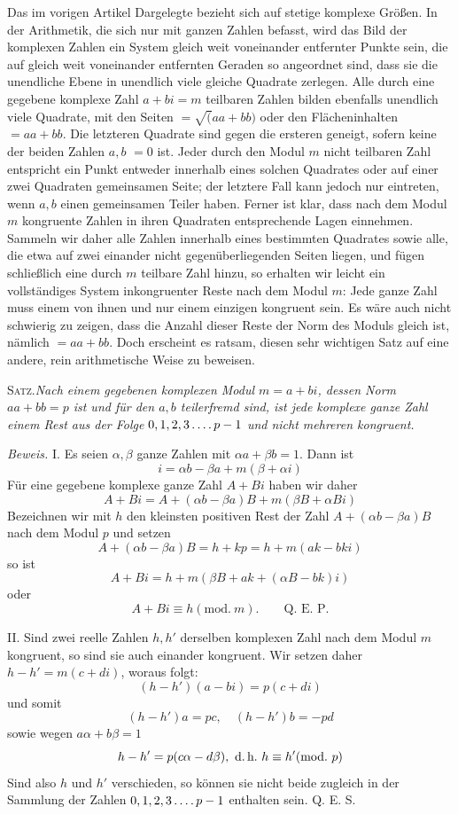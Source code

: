 Das im vorigen Artikel Dargelegte bezieht sich auf stetige komplexe Größen. In der Arithmetik, die sich nur mit ganzen Zahlen befasst, wird das Bild der komplexen Zahlen ein System gleich weit voneinander entfernter Punkte sein, die auf gleich weit voneinander entfernten Geraden so angeordnet sind, dass sie die unendliche Ebene in unendlich viele gleiche Quadrate zerlegen. Alle durch eine gegebene komplexe Zahl $a+bi=m$ teilbaren Zahlen bilden ebenfalls unendlich viele Quadrate, mit den Seiten $=\surd(aa+bb)$ oder den Flächeninhalten $=aa+bb$. Die letzteren Quadrate sind gegen die ersteren geneigt, sofern keine der beiden Zahlen $a,b$ $=0$ ist. Jeder durch den Modul $m$ nicht teilbaren Zahl entspricht ein Punkt entweder innerhalb eines solchen Quadrates oder auf einer zwei Quadraten gemeinsamen Seite; der letztere Fall kann jedoch nur eintreten, wenn $a,b$ einen gemeinsamen Teiler haben. Ferner ist klar, dass nach dem Modul $m$ kongruente Zahlen in ihren Quadraten entsprechende Lagen einnehmen. Sammeln wir daher alle Zahlen innerhalb eines bestimmten Quadrates sowie alle, die etwa auf zwei einander nicht gegenüberliegenden Seiten liegen, und fügen schließlich eine durch $m$ teilbare Zahl hinzu, so erhalten wir leicht ein vollständiges System inkongruenter Reste nach dem Modul $m$: Jede ganze Zahl muss einem von ihnen und nur einem einzigen kongruent sein. Es wäre auch nicht schwierig zu zeigen, dass die Anzahl dieser Reste der Norm des Moduls gleich ist, nämlich $=aa+bb$. Doch erscheint es ratsam, diesen sehr wichtigen Satz auf eine andere, rein arithmetische Weise zu beweisen.

\textsc{Satz.}\quad\emph{Nach einem gegebenen komplexen Modul $m=a+bi$, dessen Norm $aa+bb=p$ ist und für den $a,b$ teilerfremd sind, ist jede komplexe ganze Zahl einem Rest aus der Folge $0,1,2,3\mathinner{.\,.\,.\,.} p-1$ und nicht mehreren kongruent.}


%
\emph{Beweis.} I. Es seien $\alpha,\beta$ ganze Zahlen mit $\alpha a+\beta b=1$. Dann ist
\[
i=\alpha b-\beta a+m(\beta+\alpha i)
\]
Für eine gegebene komplexe ganze Zahl $A+Bi$ haben wir daher
\[
A+Bi=A+(\alpha b-\beta a)B+m(\beta B+\alpha Bi)
\]
Bezeichnen wir mit $h$ den kleinsten positiven Rest der Zahl $A+(\alpha b-\beta a)B$ nach dem Modul $p$ und setzen
\[
A+(\alpha b-\beta a)B=h+kp=h+m(ak-bki)
\]
so ist
\[
A+Bi=h+m(\beta B+ak+(\alpha B-bk)i)
\]
oder
\[
A+Bi\equiv h(\mathrm{mod.}\ m).\qquad\text{Q. E. P.}
\]

II. Sind zwei reelle Zahlen $h,h'$ derselben komplexen Zahl nach dem Modul $m$ kongruent, so sind sie auch einander kongruent. Wir setzen daher $h-h'=m(c+di)$, woraus folgt:
\[
(h-h')(a-bi)=p(c+di)
\]
und somit
\[
(h-h')a=pc,\quad(h-h')b=-pd
\]
sowie wegen $a\alpha+b\beta=1$
\[
h-h'=p(c\alpha-d\beta),\ \text{d.\,h.}\ h\equiv h'(\mathrm{mod.}\ p)
\]
Sind also $h$ und $h'$ verschieden, so können sie nicht beide zugleich in der Sammlung der Zahlen $0,1,2,3\mathinner{.\,.\,.\,.} p-1$ enthalten sein. Q. E. S.

